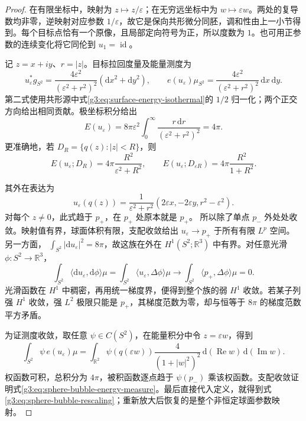 \begin{proof}
	在有限坐标中，映射为 \(z\mapsto z/\varepsilon\)；在无穷远坐标中为 \(w\mapsto\varepsilon w\)。两处的复导数均非零，逆映射对应参数 \(1/\varepsilon\)，故它是保向共形微分同胚，调和性由上一小节得到。每个目标点恰有一个原像，且局部定向符号为正，所以度数为 \(1\)。也可用正参数的连续变化将它同伦到 \(u_1=\operatorname{id}\)。

	记 \(z=x+iy\)、\(r=|z|\)。目标拉回度量及能量测度为
	\begin{equation}\label{g3:eq:sphere-bubble-density}
		u_\varepsilon^*g_{S^2}
		=\frac{4\varepsilon^2}{(\varepsilon^2+r^2)^2}
		(\mathrm dx^2+\mathrm dy^2),\qquad
		e(u_\varepsilon)\mu_{S^2}
		=\frac{4\varepsilon^2}{(\varepsilon^2+r^2)^2}
		\,\mathrm dx\,\mathrm dy.
	\end{equation}
	第二式使用共形源中式\eqref{g3:eq:surface-energy-isothermal}的 \(1/2\) 归一化；两个正交方向给出相同贡献。极坐标积分给出
	\[
		E(u_\varepsilon)
		=8\pi\varepsilon^2\int_0^\infty
		\frac{r\,\mathrm dr}{(\varepsilon^2+r^2)^2}
		=4\pi.
	\]
	更准确地，若 \(D_R=\{q(z):|z|<R\}\)，则
	\begin{equation}\label{g3:eq:sphere-bubble-local-mass}
		E(u_\varepsilon;D_R)
		=4\pi\frac{R^2}{\varepsilon^2+R^2},\qquad
		E(u_\varepsilon;D_{\varepsilon R})
		=4\pi\frac{R^2}{1+R^2}.
	\end{equation}

	其外在表达为
	\[
		u_\varepsilon(q(z))
		=\frac1{\varepsilon^2+r^2}
		(2\varepsilon x,-2\varepsilon y,r^2-\varepsilon^2).
	\]
	对每个 \(z\ne0\)，此式趋于 \(p_+\)，在 \(p_+\) 处原本就是 \(p_+\)。
	所以除了单点 \(p_-\) 外处处收敛。映射值有界，球面体积有限，支配收敛给出
	\(u_\varepsilon\to p_+\) 于所有有限 \(L^p\) 空间。另一方面，
	\(\int_{S^2}|\mathrm du_\varepsilon|^2=8\pi\)，故这族在外在
	\(H^1(S^2;\mathbb R^3)\) 中有界。对任意光滑
	\(\phi:S^2\to\mathbb R^3\)，
	\[
		\int_{S^2}\langle\mathrm du_\varepsilon,\mathrm d\phi\rangle\mu
		=\int_{S^2}\langle u_\varepsilon,\Delta\phi\rangle\mu
		\longrightarrow
		\int_{S^2}\langle p_+,\Delta\phi\rangle\mu=0.
	\]
	光滑函数在 \(H^1\) 中稠密，再用统一梯度界，便得到整个族的弱
	\(H^1\) 收敛。若某子列强 \(H^1\) 收敛，强 \(L^2\) 极限只能是
	\(p_+\)，其梯度范数为零，却与恒等于 \(8\pi\) 的梯度范数平方矛盾。

	为证测度收敛，取任意 \(\psi\in C(S^2)\)，在能量积分中令
	\(z=\varepsilon w\)，得到
	\[
		\int_{S^2}\psi\,e(u_\varepsilon)\mu
		=\int_{\mathbb R^2}
		\psi(q(\varepsilon w))\frac4{(1+|w|^2)^2}
		\,\mathrm d(\operatorname{Re}w)\,\mathrm d(\operatorname{Im}w).
	\]
	权函数可积，总积分为 \(4\pi\)，被积函数逐点趋于
	\(\psi(p_-)\) 乘该权函数。支配收敛证明式\eqref{g3:eq:sphere-bubble-energy-measure}。最后直接代入定义，就得到式\eqref{g3:eq:sphere-bubble-rescaling}；重新放大后恢复的是整个非恒定球面参数映射。
\end{proof}

